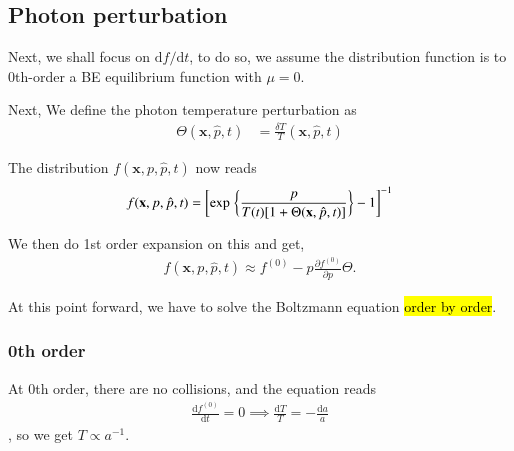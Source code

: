 \documentclass[a4paper, 12pt]{article}
\begin{document}
{{      \subsection{Photon perturbation}%
        \label{sub:Photon perturbation}
        Next, we shall focus on \( \mathrm{d}f/\mathrm{d}t \), to do
        so, we assume the distribution function is to 0th-order a BE
        equilibrium function with \( \mu = 0 \).



        Next, We define the photon temperature perturbation as 
        \begin{align}
          \label{photon perturbation}
          \Theta(\textbf{x}, \hat{p}, t) &= \frac{\delta
          T}{T}(\textbf{x}, \hat{p}, t)  
        \end{align}

        The distribution \( f(\textbf{x}, p, \hat{p}, t) \) now reads 
        \begin{align}
          \label{BE equilibrium distribution function}
          f(\textbf{x}, p, \hat{p}, t) = \bigg[\mathrm{exp}
          \hspace{0.1cm} \bigg\{ \frac{p}{T(t)[1 +
          \Theta(\textbf{x}, \hat{p}, t)]} \bigg\} - 1 \bigg]^{-1}
        \end{align}

        We then do 1st order expansion on this and get, 
        \begin{align}
          \label{1st order on f dist}
          f(\textbf{x}, p, \hat{p}, t) \approx f^{(0)} - p
          \frac{\partial f^{(0)} }{\partial p} \Theta.
        \end{align}

        At this point forward, we have to solve the Boltzmann
        equation \hl{order by order}.    

        \subsubsection{0th order}%
          \label{sub:0th order}
          At 0th order, there are no collisions, and the equation
          reads 
          \begin{align}
            \label{0th order of boltzmann}
            \frac{\mathrm{d}f^{(0)} }{\mathrm{d}t} = 0 \implies
            \frac{\mathrm{d}T}{T} = - \frac{\mathrm{d}a}{a}
          \end{align}, so we get \( T \propto a^{-1}  \). 

}}
\end{document}
